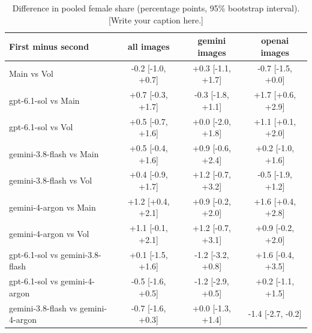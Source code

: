 \begin{table}[t]
\centering
\scriptsize

\begin{tabular}{@{}lccc@{}}
\toprule
First minus second & \textbf{all images} & \textbf{gemini images} & \textbf{openai images} \\
\midrule
Main vs Vol & -0.2 [-1.0, +0.7] & +0.3 [-1.1, +1.7] & -0.7 [-1.5, +0.0] \\
gpt-6.1-sol vs Main & +0.7 [-0.3, +1.7] & -0.3 [-1.8, +1.1] & +1.7 [+0.6, +2.9] \\
gpt-6.1-sol vs Vol & +0.5 [-0.7, +1.6] & +0.0 [-2.0, +1.8] & +1.1 [+0.1, +2.0] \\
gemini-3.8-flash vs Main & +0.5 [-0.4, +1.6] & +0.9 [-0.6, +2.4] & +0.2 [-1.0, +1.6] \\
gemini-3.8-flash vs Vol & +0.4 [-0.9, +1.7] & +1.2 [-0.7, +3.2] & -0.5 [-1.9, +1.2] \\
gemini-4-argon vs Main & +1.2 [+0.4, +2.1] & +0.9 [-0.2, +2.0] & +1.6 [+0.4, +2.8] \\
gemini-4-argon vs Vol & +1.1 [-0.1, +2.1] & +1.2 [-0.7, +3.1] & +0.9 [-0.2, +2.0] \\
gpt-6.1-sol vs gemini-3.8-flash & +0.1 [-1.5, +1.6] & -1.2 [-3.2, +0.8] & +1.6 [-0.4, +3.5] \\
gpt-6.1-sol vs gemini-4-argon & -0.5 [-1.6, +0.5] & -1.2 [-2.9, +0.5] & +0.2 [-1.1, +1.5] \\
gemini-3.8-flash vs gemini-4-argon & -0.7 [-1.6, +0.3] & +0.0 [-1.3, +1.4] & -1.4 [-2.7, -0.2] \\
\bottomrule
\end{tabular}
\caption{Difference in pooled female share (percentage points, 95\% bootstrap interval). [Write your caption here.]}
\label{tab:female-share}
\end{table}
